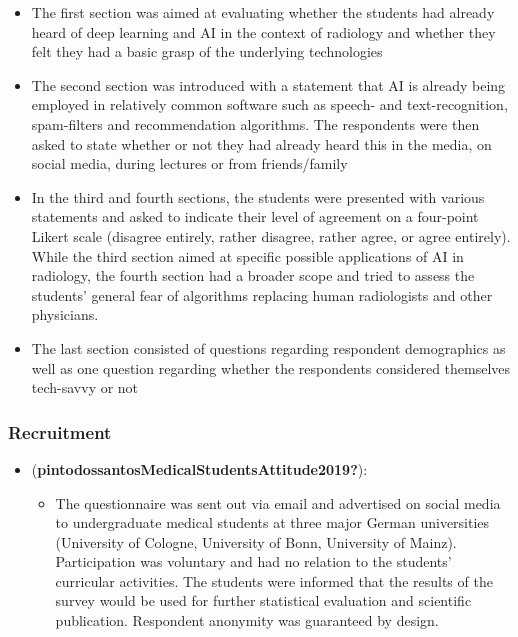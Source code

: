 \documentclass[
  man]{apa7}
\providecommand{\tightlist}{%
  \setlength{\itemsep}{0pt}\setlength{\parskip}{0pt}}
\begin{document}
\begin{itemize}
\tightlist
\item
  The first section was aimed at evaluating whether the students had already heard
  of deep learning and AI in the context of radiology and whether they felt they had a basic grasp of the underlying technologies
\item
  The second section was introduced with a statement that AI is already being employed in relatively common software such as speech- and text-recognition, spam-filters and recommendation algorithms. The respondents were then asked to state whether or not they had already heard this in the media, on social media, during lectures or from friends/family
\item
  In the third and fourth sections, the students were presented with various statements and asked to indicate their level of agreement on a four-point Likert scale (disagree entirely, rather disagree, rather agree, or agree entirely). While the third section aimed at specific possible applications of AI in radiology, the fourth section had a broader scope and tried to assess the students' general fear of algorithms replacing human radiologists and other physicians.
\item
  The last section consisted of questions regarding respondent demographics as well as one question regarding whether the respondents considered themselves tech-savvy or not
\end{itemize}

\hypertarget{recruitment}{%
\subsubsection{Recruitment}\label{recruitment}}

\begin{itemize}
\tightlist
\item
  (\textbf{pintodossantosMedicalStudentsAttitude2019?}):

  \begin{itemize}
  \tightlist
  \item
    The questionnaire was sent out via email and advertised on social media to undergraduate medical students at three major German universities (University of Cologne, University of Bonn, University of Mainz). Participation was voluntary and had no relation to the students' curricular activities. The students were informed that the results of the survey would be used for further statistical evaluation and scientific publication. Respondent anonymity was guaranteed by design.
  \end{itemize}
\end{itemize}
\end{document}
